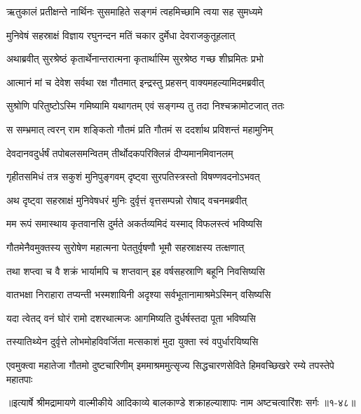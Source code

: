 \twolineshloka
{ऋतुकालं प्रतीक्षन्ते नार्थिनः सुसमाहिते}
{सङ्गमं त्वहमिच्छामि त्वया सह सुमध्यमे} %

\twolineshloka
{मुनिवेषं सहस्राक्षं विज्ञाय रघुनन्दन}
{मतिं चकार दुर्मेधा देवराजकुतूहलात्} %

\twolineshloka
{अथाब्रवीत् सुरश्रेष्ठं कृतार्थेनान्तरात्मना}
{कृतार्थास्मि सुरश्रेष्ठ गच्छ शीघ्रमितः प्रभो} %

\twolineshloka
{आत्मानं मां च देवेश सर्वथा रक्ष गौतमात्}
{इन्द्रस्तु प्रहसन् वाक्यमहल्यामिदमब्रवीत्} %

\twolineshloka
{सुश्रोणि परितुष्टोऽस्मि गमिष्यामि यथागतम्}
{एवं सङ्गम्य तु तदा निश्चक्रामोटजात् ततः} %

\twolineshloka
{स सम्भ्रमात् त्वरन् राम शङ्कितो गौतमं प्रति}
{गौतमं स ददर्शाथ प्रविशन्तं महामुनिम्} %

\twolineshloka
{देवदानवदुर्धर्षं तपोबलसमन्वितम्}
{तीर्थोदकपरिक्लिन्नं दीप्यमानमिवानलम्} %

\twolineshloka
{गृहीतसमिधं तत्र सकुशं मुनिपुङ्गवम्}
{दृष्ट्वा सुरपतिस्त्रस्तो विषण्णवदनोऽभवत्} %

\twolineshloka
{अथ दृष्ट्वा सहस्राक्षं मुनिवेषधरं मुनिः}
{दुर्वृत्तं वृत्तसम्पन्नो रोषाद् वचनमब्रवीत्} %

\twolineshloka
{मम रूपं समास्थाय कृतवानसि दुर्मते}
{अकर्तव्यमिदं यस्माद् विफलस्त्वं भविष्यसि} %

\twolineshloka
{गौतमेनैवमुक्तस्य सुरोषेण महात्मना}
{पेततुर्वृषणौ भूमौ सहस्राक्षस्य तत्क्षणात्} %

\twolineshloka
{तथा शप्त्वा च वै शक्रं भार्यामपि च शप्तवान्}
{इह वर्षसहस्राणि बहूनि निवसिष्यसि} %

\twolineshloka
{वातभक्षा निराहारा तप्यन्ती भस्मशायिनी}
{अदृश्या सर्वभूतानामाश्रमेऽस्मिन् वसिष्यसि} %

\twolineshloka
{यदा त्वेतद् वनं घोरं रामो दशरथात्मजः}
{आगमिष्यति दुर्धर्षस्तदा पूता भविष्यसि} %

\twolineshloka
{तस्यातिथ्येन दुर्वृत्ते लोभमोहविवर्जिता}
{मत्सकाशं मुदा युक्ता स्वं वपुर्धारयिष्यसि} %

\threelineshloka
{एवमुक्त्वा महातेजा गौतमो दुष्टचारिणीम्}
{इममाश्रममुत्सृज्य सिद्धचारणसेविते}
{हिमवच्छिखरे रम्ये तपस्तेपे महातपाः} %


॥इत्यार्षे श्रीमद्रामायणे वाल्मीकीये आदिकाव्ये बालकाण्डे शक्राहल्याशापः नाम अष्टचत्वारिंशः सर्गः ॥१-४८॥
